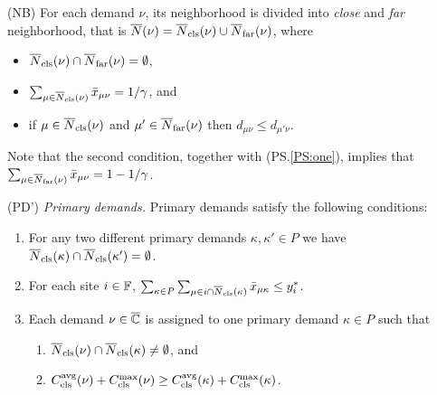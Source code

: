 \documentclass{llncs}
\begin{document}
\begin{description}
	
      \renewcommand{\theenumii}{(\alph{enumii})}
      \renewcommand{\labelenumii}{\theenumii}

\item{(NB)} \label{NB}
	For each demand $\nu$, its neighborhood is divided into \emph{close} and
	\emph{far} neighborhood, that is ${\overline{N}}(\nu) = {\overline{N}}_{\text{cls}}(\nu) \cup {\overline{N}}_{\text{far}}(\nu)$, where
	\begin{itemize}
	\item ${\overline{N}}_{\text{cls}}(\nu) \cap {\overline{N}}_{\text{far}}(\nu) = \emptyset$,
	\item $\sum_{\mu\in{\overline{N}}_{\text{cls}}(\nu)} {\bar x}_{\mu\nu} =1/\gamma$, and 
	\item if $\mu\in {\overline{N}}_{\text{cls}}(\nu)$ and $\mu'\in {\overline{N}}_{\text{far}}(\nu)$ 
				then $d_{\mu\nu}\le d_{\mu'\nu}$.   
	\end{itemize}
	Note that the second condition, together with (PS.\ref{PS:one}), implies
	that $\sum_{\mu\in{\overline{N}}_{\text{far}}(\nu)} {\bar x}_{\mu\nu} =1-1/\gamma$.

\item{(PD')} \emph{Primary demands.}
	Primary demands satisfy the following conditions:

	\begin{enumerate}
		
	\item\label{PD1:disjoint}  For any two different primary demands $\kappa,\kappa'\in P$ we have
				${\overline{N}}_{\text{cls}}(\kappa)\cap {\overline{N}}_{\text{cls}}(\kappa') = \emptyset$.

	\item \label{PD1:yi} For each site $i\in\mathbb{F}$, 
		$ \sum_{\kappa\in P}\sum_{\mu\in i\cap{\overline{N}}_{\text{cls}}(\kappa)}{\bar x}_{\mu\kappa} \leq y_i^\ast$.
		
	\item \label{PD1:assign} Each demand $\nu\in\overline{\mathbb{C}}$ is assigned
        to one primary demand $\kappa\in P$ such that

  			\begin{enumerate}
	
				\item \label{PD1:assign:overlap} ${\overline{N}}_{\text{cls}}(\nu) \cap {\overline{N}}_{\text{cls}}(\kappa) \neq \emptyset$, and
				\item \label{PD1:assign:cost}
          $C_{\text{cls}}^{{\mbox{\scriptsize\rm avg}}}(\nu)+C_{\text{cls}}^{\max}(\nu) \geq
          C_{\text{cls}}^{{\mbox{\scriptsize\rm avg}}}(\kappa)+C_{\text{cls}}^{\max}(\kappa)$.
			\end{enumerate}

	\end{enumerate}
	

\end{description}
\end{document}
